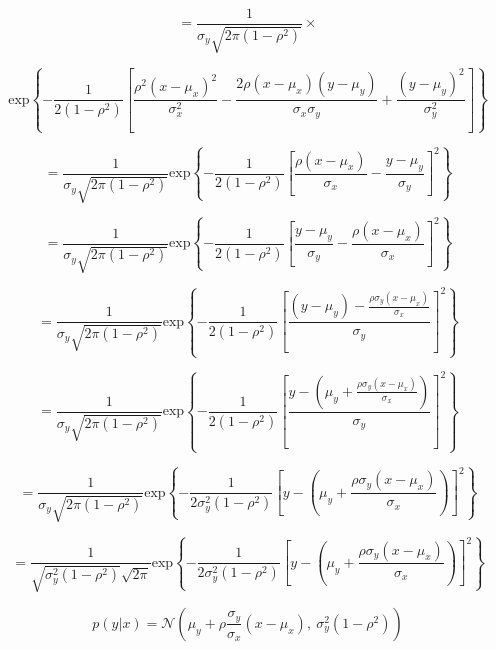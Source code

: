 \documentclass[fleqn]{article}
\begin{document}
\begin{enumerate}
		\begin{equation*}
			= \frac{1}{\sigma_y\sqrt{2\pi(1-\rho^2)}} \times
		\end{equation*}
	
		\begin{equation*}		
			\text{exp}\left\{-\frac{1}{2(1-\rho^2)}\left[\frac{\rho^2(x-\mu_x)^2}{\sigma_x^2}-\frac{2\rho(x-\mu_x)(y-\mu_y)}{\sigma_x\sigma_y}+\frac{(y-\mu_y)^2}{\sigma_y^2}\right]\right\}
		\end{equation*}
	
		\begin{equation*}		
			= \frac{1}{\sigma_y\sqrt{2\pi(1-\rho^2)}}\text{exp}\left\{-\frac{1}{2(1-\rho^2)}\left[\frac{\rho(x-\mu_x)}{\sigma_x} - \frac{y - \mu_y}{\sigma_y}\right]^2\right\}
		\end{equation*}
		
		\begin{equation*}		
			= \frac{1}{\sigma_y\sqrt{2\pi(1-\rho^2)}}\text{exp}\left\{-\frac{1}{2(1-\rho^2)}\left[\frac{y - \mu_y}{\sigma_y} - \frac{\rho(x-\mu_x)}{\sigma_x}\right]^2\right\}
		\end{equation*}
		
		\begin{equation*}		
			= \frac{1}{\sigma_y\sqrt{2\pi(1-\rho^2)}}\text{exp}\left\{-\frac{1}{2(1-\rho^2)}\left[\frac{(y - \mu_y) - \frac{\rho\sigma_y(x-\mu_x)}{\sigma_x}}{\sigma_y}\right]^2\right\}
		\end{equation*}
		
		\begin{equation*}		
			= \frac{1}{\sigma_y\sqrt{2\pi(1-\rho^2)}}\text{exp}\left\{-\frac{1}{2(1-\rho^2)}\left[\frac{y - \left(\mu_y + \frac{\rho\sigma_y(x-\mu_x)}{\sigma_x}\right)}{\sigma_y}\right]^2\right\}
		\end{equation*}
		
		\begin{equation*}		
			= \frac{1}{\sigma_y\sqrt{2\pi(1-\rho^2)}}\text{exp}\left\{-\frac{1}{2\sigma_y^2(1-\rho^2)}\left[y - \left(\mu_y + \frac{\rho\sigma_y(x-\mu_x)}{\sigma_x}\right)\right]^2\right\}
		\end{equation*}
		
		\begin{equation*}		
			= \frac{1}{\sqrt{\sigma_y^2(1-\rho^2)}\sqrt{2\pi}}\text{exp}\left\{-\frac{1}{2\sigma_y^2(1-\rho^2)}\left[y - \left(\mu_y + \frac{\rho\sigma_y(x-\mu_x)}{\sigma_x}\right)\right]^2\right\}
		\end{equation*}
		
		\begin{equation*}
			p(y|x) = \mathcal{N}\left(\mu_y + \rho\frac{\sigma_y}{\sigma_x}(x-\mu_x),\:\sigma_y^2(1 - \rho^2)\right)
		\end{equation*}
		

\end{enumerate}
\end{document}
